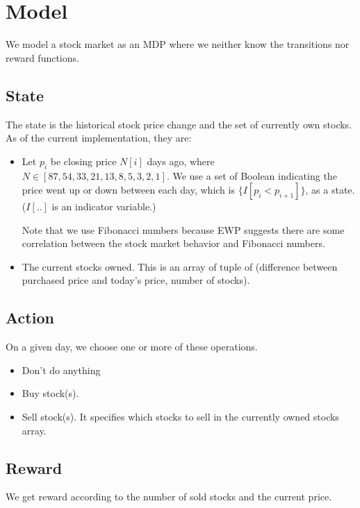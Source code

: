 \documentclass[12pt]{article}
\begin{document}
\section{Model}

We model a stock market as an MDP where we neither know the
transitions nor reward functions.

\subsection{State}

The state is the historical stock price change and the set of
currently own stocks. As of the current implementation, they are:

\begin{itemize}
\item Let $p_i$ be closing price $N[i]$ days ago, where $N \in [87,54,33,21,13,8,5,3,2,1]$.
  We use a set of Boolean indicating the price went up or down between each day, which is $\{I[p_i < p_{i+1}]\}$, as a
  state. ($I[..]$ is an indicator variable.)

  Note that we use Fibonacci numbers because EWP suggests there are
  some correlation between the stock market behavior and Fibonacci
  numbers.
  
\item The current stocks owned. This is an array of tuple of
  (difference between purchased price and today's price, number of
  stocks).
\end{itemize}

\subsection{Action}

On a given day, we choose one or more of these operations. 

\begin{itemize}
\item Don't do anything
\item Buy stock(s).
\item Sell stock(s). It specifies which stocks to sell in the
  currently owned stocks array.
\end{itemize}

\subsection{Reward}

We get reward according to the number of sold stocks and the
current price. 
\end{document}
